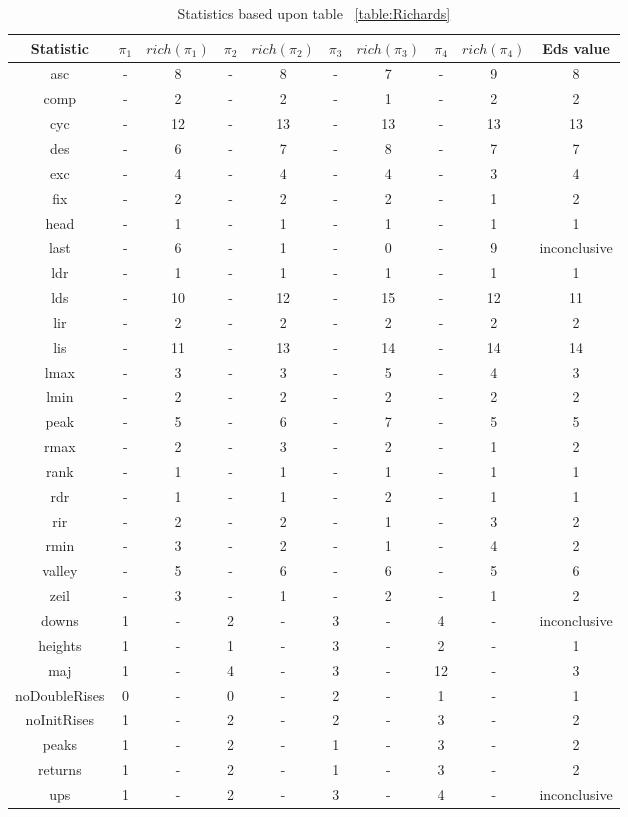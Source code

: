 \documentclass[12pt]{article}
\begin{document}
\begin{table}[H]
\caption{Statistics based upon table ~\ref{table:Richards}}
\centering
\tabcolsep=0.11cm
\begin{tabular}{c | c c c c c c c c | c}
\hline\hline
Statistic & $\pi_1$ & $rich(\pi_1)$ & $\pi_2$ & $rich(\pi_2)$ & $\pi_3$ & $rich(\pi_3)$ & $\pi_4$ & $rich(\pi_4)$ & Eds value\\ [0.5ex]
\hline
asc & - & 8 & - & 8 & - & 7 & - & 9 & 8\\
comp & - & 2 & - & 2 & - & 1 & - & 2 & 2\\
cyc & - & 12 & - & 13 & - & 13 & - & 13 & 13\\
des & - &  6 & - & 7 & - & 8 & - & 7 & 7\\
exc & - &  4 & - & 4 & - & 4 & - & 3 & 4\\
fix & - &  2 & - & 2 & - & 2 & - & 1 & 2\\
head & - &  1 & - & 1 & - & 1 & - & 1 & 1\\
last & - & 6 & - & 1 & - & 0 & - & 9 & inconclusive\\
ldr & - &  1 & - & 1 & - & 1 & - & 1 & 1\\
lds & - &  10 & - & 12 & - & 15 & - & 12 & 11\\ 
lir & - &  2 & - & 2 & - & 2 & - & 2 & 2\\
lis & - &  11 & - & 13 & - & 14 & - & 14 & 14\\ 
lmax & - &  3 & - & 3 & - & 5 & - & 4 & 3\\
lmin & - &  2 & - & 2 & - & 2 & - & 2 & 2\\
peak & - &  5 & - & 6 & - & 7 & - & 5 & 5\\
rmax & - &  2 & - & 3 & - & 2 & - & 1 & 2\\
rank & - &  1 & - & 1 & - & 1 & - & 1 & 1\\
rdr & - & 1 & - & 1 & - & 2 & - & 1 & 1\\
rir & - & 2 & - & 2 & - & 1 & - & 3 & 2\\
rmin & - & 3 & - & 2 & - & 1 & - & 4 & 2\\
valley & - & 5 & - & 6 & - & 6 & - & 5 & 6\\  
zeil & - & 3 & - & 1 & - & 2 & - & 1 & 2\\
\hline
downs & 1 & - & 2 & - & 3 & - & 4 & - & inconclusive\\
heights & 1 & - & 1 & - & 3 & - & 2 & - & 1\\  
maj & 1 & - & 4 & - & 3 & - & 12 & - & 3\\ 
noDoubleRises & 0 & - & 0 & - & 2 & - & 1 & - & 1\\
noInitRises & 1 & - & 2 & - & 2 & - & 3 & - & 2\\
peaks & 1 & - & 2 & - & 1 & - & 3 & - & 2\\
returns & 1 & - & 2 & - & 1 & - & 3 & - & 2\\ 
ups & 1 & - & 2 & - & 3 & - & 4 & - & inconclusive\\
\hline
\end{tabular}
\label{table:Richards1}
\end{table}
\end{document}
